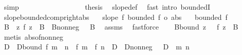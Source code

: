 \begin{isabellebody}
\ simp\isanewline
\ \ \ \ \ \ \isamarkupfalse%
\isanewline
\ \ \ \ \isamarkupfalse%
\isanewline
\ \ \isacommand{{\isacharbraceright}{\kern0pt}}\isamarkupfalse%
\isanewline
\ \ \isamarkupfalse%
\ {\isacharquery}{\kern0pt}thesis\ \isamarkupfalse%
\ slope{\isacharunderscore}{\kern0pt}def\ \isamarkupfalse%
\ {\isacharparenleft}{\kern0pt}fast\ intro{\isacharcolon}{\kern0pt}\ boundedI{\isacharparenright}{\kern0pt}\isanewline
{}\isamarkupfalse%
%
\endisatagproof
{\isafoldproof}%
%
\isadelimproof
\isanewline
%
\endisadelimproof
\isanewline
{}\isamarkupfalse%
\ slope{\isacharunderscore}{\kern0pt}bounded{\isacharunderscore}{\kern0pt}comp{\isacharunderscore}{\kern0pt}right{\isacharunderscore}{\kern0pt}abs{\isacharcolon}{\kern0pt}\isanewline
\ \ \ {\isachardoublequoteopen}slope\ f{\isachardoublequoteclose}\ {\isachardoublequoteopen}bounded\ {\isacharparenleft}{\kern0pt}f\ o\ abs{\isacharparenright}{\kern0pt}{\isachardoublequoteclose}\isanewline
\ \ \ {\isachardoublequoteopen}bounded\ f{\isachardoublequoteclose}\isanewline
%
\isadelimproof
%
\endisadelimproof
%
\isatagproof
{}\isamarkupfalse%
\ {\isacharminus}{\kern0pt}\isanewline
\ \ \isamarkupfalse%
\ B\ \ {\isachardoublequoteopen}{\isasymforall}z{\isachardot}{\kern0pt}\ {\isasymbar}f\ {\isasymbar}z{\isasymbar}{\isasymbar}\ {\isasymle}\ B{\isachardoublequoteclose}\ \ B{\isacharunderscore}{\kern0pt}nonneg{\isacharcolon}{\kern0pt}\ {\isachardoublequoteopen}{}\ {\isasymle}\ B{\isachardoublequoteclose}\ \isamarkupfalse%
\ assms\ \isamarkupfalse%
\ fastforce\isanewline
\ \ \isamarkupfalse%
\ B{\isacharunderscore}{\kern0pt}bound{\isacharcolon}{\kern0pt}\ {\isachardoublequoteopen}{\isasymforall}z\ {\isasymge}\ {}{\isachardot}{\kern0pt}\ {\isasymbar}f\ z{\isasymbar}\ {\isasymle}\ B{\isachardoublequoteclose}\ \isamarkupfalse%
\ {\isacharparenleft}{\kern0pt}metis\ abs{\isacharunderscore}{\kern0pt}of{\isacharunderscore}{\kern0pt}nonneg{\isacharparenright}{\kern0pt}\isanewline
\isanewline
\ \ \isamarkupfalse%
\ D\ \ D{\isacharunderscore}{\kern0pt}bound{\isacharcolon}{\kern0pt}\ {\isachardoublequoteopen}{\isasymbar}f\ {\isacharparenleft}{\kern0pt}m\ {\isacharplus}{\kern0pt}\ n{\isacharparenright}{\kern0pt}\ {\isacharminus}{\kern0pt}\ {\isacharparenleft}{\kern0pt}f\ m\ {\isacharplus}{\kern0pt}\ f\ n{\isacharparenright}{\kern0pt}{\isasymbar}\ {\isasymle}\ D{\isachardoublequoteclose}\ \ D{\isacharunderscore}{\kern0pt}nonneg{\isacharcolon}{\kern0pt}\ {\isachardoublequoteopen}{}\ {\isasymle}\ D{\isachardoublequoteclose}\ \ m\ n\ \isamarkupfalse%

\end{isabellebody}
